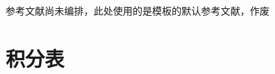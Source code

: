 \documentclass[lang=cn,newtx,10pt,scheme=chinese]{elegantbook}
\begin{document}
\nocite{*}

\printbibliography[heading=bibintoc, title=\ebibname]
参考文献尚未编排，此处使用的是模板的默认参考文献，作废
\appendix

\chapter{积分表}


\end{document}
